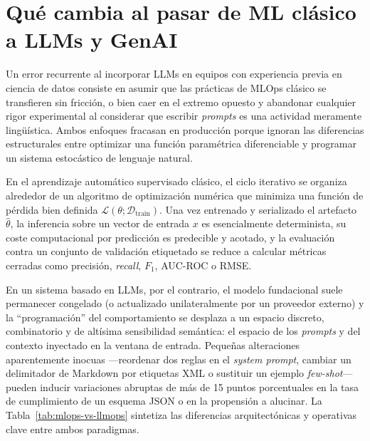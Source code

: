 \section[ML Clásico vs. LLMOps y GenAI]{Qué cambia al pasar de ML clásico a LLMs y GenAI}\label{sec:mlops-vs-llmops}

Un error recurrente al incorporar LLMs en equipos con experiencia previa en ciencia de datos consiste en asumir que las prácticas de MLOps clásico se transfieren sin fricción, o bien caer en el extremo opuesto y abandonar cualquier rigor experimental al considerar que escribir \textit{prompts} es una actividad meramente lingüística. Ambos enfoques fracasan en producción porque ignoran las diferencias estructurales entre optimizar una función paramétrica diferenciable y programar un sistema estocástico de lenguaje natural.

En el aprendizaje automático supervisado clásico, el ciclo iterativo se organiza alrededor de un algoritmo de optimización numérica que minimiza una función de pérdida bien definida $\mathcal{L}(\theta; \mathcal{D}_{\text{train}})$. Una vez entrenado y serializado el artefacto $\hat{\theta}$, la inferencia sobre un vector de entrada $x$ es esencialmente determinista, su coste computacional por predicción es predecible y acotado, y la evaluación contra un conjunto de validación etiquetado se reduce a calcular métricas cerradas como precisión, \textit{recall}, $F_1$, AUC-ROC o RMSE.

En un sistema basado en LLMs, por el contrario, el modelo fundacional suele permanecer congelado (o actualizado unilateralmente por un proveedor externo) y la ``programación'' del comportamiento se desplaza a un espacio discreto, combinatorio y de altísima sensibilidad semántica: el espacio de los \textit{prompts} y del contexto inyectado en la ventana de entrada. Pequeñas alteraciones aparentemente inocuas ---reordenar dos reglas en el \textit{system prompt}, cambiar un delimitador de Markdown por etiquetas XML o sustituir un ejemplo \textit{few-shot}--- pueden inducir variaciones abruptas de más de 15 puntos porcentuales en la tasa de cumplimiento de un esquema JSON o en la propensión a alucinar. La Tabla~\ref{tab:mlops-vs-llmops} sintetiza las diferencias arquitectónicas y operativas clave entre ambos paradigmas.


